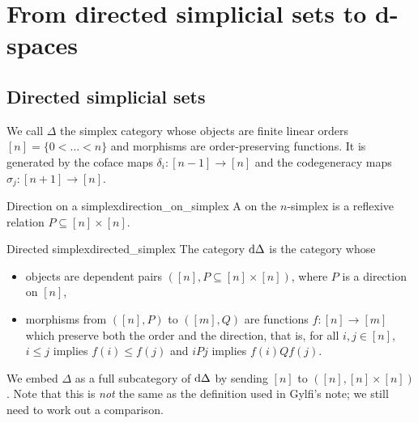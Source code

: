 \section{From directed simplicial sets to d-spaces}

\subsection{Directed simplicial sets}

We call \( \Delta \) the simplex category whose objects are finite linear orders \( [n] = \{0 < \dots < n\} \) and morphisms are order-preserving functions.
It is generated by the coface maps \( \delta_i\colon [n-1] \to [n] \) and the codegeneracy maps \( \sigma_j\colon [n+1] \to [n] \).

\begin{cdef}{Direction on a simplex}{direction_on_simplex}
	A  on the \( n \)-simplex is a reflexive relation \( P \subseteq [n] \times [n] \).
\end{cdef}

\begin{cdef}{Directed simplex}{directed_simplex}
	The  category \( \mathrm{d}\Delta \) is the category whose
	\begin{itemize}
		\item objects are dependent pairs \( ([n], P \subseteq [n] \times [n])  \), where \( P \) is a direction on \( [n] \),
		\item morphisms from \( ([n], P) \) to \( ([m], Q) \) are functions \( f\colon [n] \to [m] \) which preserve both the order and the direction, that is, for all \( i, j \in [n] \), \( i \leq j \) implies \( f(i) \leq f(j) \) and \( i P j \) implies \( f(i) Q f(j) \). 
	\end{itemize}
\end{cdef}
We embed \( \Delta \) as a full subcategory of \( \mathrm{d}\Delta \) by sending \( [n] \) to \( ([n], [n] \times [n]) \).
Note that this is \emph{not} the same as the definition used in Gylfi's note; we still need to work out a comparison.

